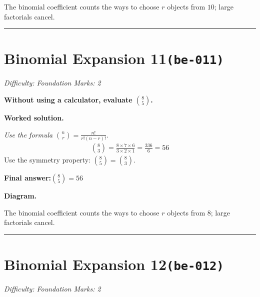 \documentclass[11pt]{article}
\newcommand{\question}[1]{\par\medskip\noindent\textbf{#1}\par}
\begin{document}
\begin{center}
\end{center}
\small The binomial coefficient counts the ways to choose $r$ objects from $10$; large factorials cancel.\normalsize

\medskip\hrule

\section*{Binomial Expansion 11\quad\small\texttt{(be-011)}}
\textit{Difficulty: Foundation \quad\textbar\quad Marks: 2}

\question{Without using a calculator, evaluate \( \binom{8}{5} \).}

\textbf{Worked solution.}

\textit{Use the formula \(\binom{n}{r} = \frac{n!}{r!(n-r)!}\).}
\[\begin{gathered}
\binom{8}{3} = \frac{8 \times 7 \times 6}{3 \times 2 \times 1} = \frac{336}{6} = 56
\end{gathered}\]
Use the symmetry property: \( \binom{8}{5} = \binom{8}{3} \).

\begin{answerbox}
\textbf{Final answer:}\quad \(\displaystyle \binom{8}{5} = 56\)
\end{answerbox}
\textbf{Diagram.}

\begin{center}
\end{center}
\small The binomial coefficient counts the ways to choose $r$ objects from $8$; large factorials cancel.\normalsize

\medskip\hrule

\section*{Binomial Expansion 12\quad\small\texttt{(be-012)}}
\textit{Difficulty: Foundation \quad\textbar\quad Marks: 2}
\end{document}
